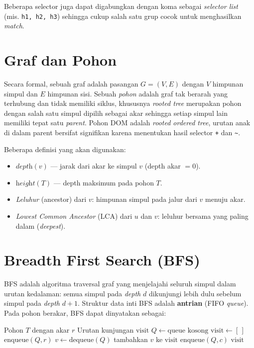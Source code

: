 Beberapa selector juga dapat digabungkan dengan koma sebagai \textit{selector list} (mis. \texttt{h1, h2, h3}) sehingga cukup salah satu grup cocok untuk menghasilkan \textit{match}.

\section{Graf dan Pohon}

Secara formal, sebuah graf adalah pasangan $G = (V, E)$ dengan $V$ himpunan simpul dan $E$ himpunan sisi. Sebuah \textit{pohon} adalah graf tak berarah yang terhubung dan tidak memiliki siklus, khususnya \textit{rooted tree} merupakan pohon dengan salah satu simpul dipilih sebagai akar sehingga setiap simpul lain memiliki tepat satu \textit{parent}. Pohon DOM adalah \textit{rooted ordered tree}, urutan anak di dalam parent bersifat signifikan karena menentukan hasil selector \texttt{+} dan \texttt{\textasciitilde}.

Beberapa definisi yang akan digunakan:
\begin{itemize}
    \item $\textit{depth}(v)$ --- jarak dari akar ke simpul $v$ (depth akar $= 0$).
    \item $\textit{height}(T)$ --- depth maksimum pada pohon $T$.
    \item \textit{Leluhur} (ancestor) dari $v$: himpunan simpul pada jalur dari $v$ menuju akar.
    \item \textit{Lowest Common Ancestor} (LCA) dari $u$ dan $v$: leluhur bersama yang paling dalam (\textit{deepest}).
\end{itemize}

\section{Breadth First Search (BFS)}

BFS adalah algoritma traversal graf yang menjelajahi seluruh simpul dalam urutan kedalaman: semua simpul pada \textit{depth} $d$ dikunjungi lebih dulu sebelum simpul pada \textit{depth} $d+1$. Struktur data inti BFS adalah \textbf{antrian} (FIFO \textit{queue}). Pada pohon berakar, BFS dapat dinyatakan sebagai:

\begin{algorithm}[H]
\caption{BFS pada pohon berakar}
\begin{algorithmic}[1]
\Require Pohon $T$ dengan akar $r$
\Ensure Urutan kunjungan $\mathrm{visit}$
\State $Q \gets \text{queue kosong}$
\State $\mathrm{visit} \gets [\,]$
\State enqueue$(Q, r)$
    \State $v \gets \text{dequeue}(Q)$
    \State tambahkan $v$ ke $\mathrm{visit}$
        \State enqueue$(Q, c)$
    \EndFor
\EndWhile
\State \Return $\mathrm{visit}$
\end{algorithmic}
\end{algorithm}

